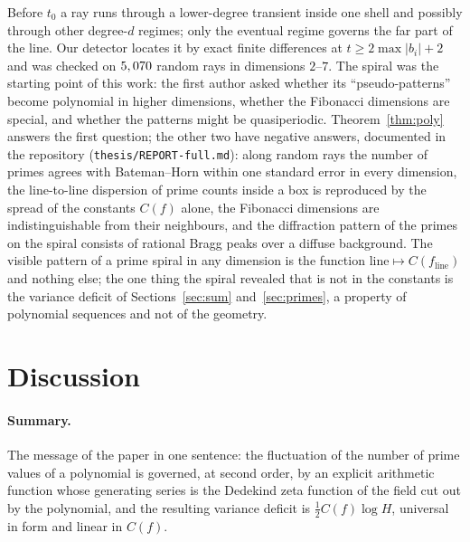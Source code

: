 \documentclass[11pt,a4paper]{article}
\theoremstyle{remark}\newtheorem{remark}[theorem]{Remark}
\begin{document}
Before $t_0$ a ray runs through a lower-degree transient inside one shell and possibly through other
degree-$d$ regimes; only the eventual regime governs the far part of the line. Our detector locates it
by exact finite differences at $t\ge2\max|b_i|+2$ and was checked on $5,070$ random rays in
dimensions $2$--$7$. The spiral was the starting point of this work: the first author asked whether its
``pseudo-patterns'' become polynomial in higher dimensions, whether the Fibonacci dimensions are special,
and whether the patterns might be quasiperiodic. Theorem~\ref{thm:poly} answers the first question; the
other two have negative answers, documented in the repository (\texttt{thesis/REPORT-full.md}): along
random rays the number of primes agrees with Bateman--Horn within one standard error in every dimension,
the line-to-line dispersion of prime counts inside a box is reproduced by the spread of the constants
$C(f)$ alone, the Fibonacci dimensions are indistinguishable from their neighbours, and the diffraction
pattern of the primes on the spiral consists of rational Bragg peaks over a diffuse background. The
visible pattern of a prime spiral in any dimension is the function $\text{line}\mapsto C(f_{\text{line}})$
and nothing else; the one thing the spiral revealed that is not in the constants is the variance deficit
of Sections~\ref{sec:sum} and~\ref{sec:primes}, a property of polynomial sequences and not of the geometry.

\FloatBarrier
\section{Discussion}\label{sec:disc}

\paragraph{Summary.} The message of the paper in one sentence: the fluctuation of the number of prime
values of a polynomial is governed, at second order, by an explicit arithmetic function whose generating
series is the Dedekind zeta function of the field cut out by the polynomial, and the resulting variance
deficit is $\tfrac12C(f)\log H$, universal in form and linear in $C(f)$.
\end{document}
